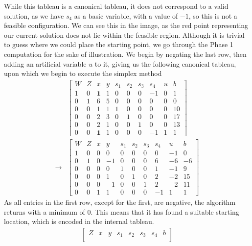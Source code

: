 \documentclass[10pt]{article}
\newenvironment{answerblock}[1]{\tcolorbox[beamer,noparskip,breakable,title={#1}]}{\endtcolorbox}
\begin{document}
\begin{answerblock}{Linear Programming Example Evaluation}
	\vspace{6pt}
	While this tableau is a canonical tableau, it does not correspond to a valid solution, as we have $s_4$ as a basic variable, with a value of $-1$, so this is not a feasible configuration. We can see this in the image, as the red point representing our current solution does not lie within the feasible region. Although it is trivial to guess where we could place the starting point, we go through the Phase 1 computation for the sake of illustration. We begin by negating the last row, then adding an artificial variable $u$ to it, giving us the following canonical tableau, upon which we begin to execute the simplex method
	\begin{align*}
	&\begin{bmatrix}
	W	& Z	& x				& y	& s_1	& s_2	& s_3	& s_4	& u	& b \\
	1	& 0	& \textbf{1}	& 1	& 0		& 0		& 0		& -1	& 0	& 1 \\
	0	& 1	& 6				& 5	& 0		& 0 	& 0 	& 0		& 0	& 0 \\
	0	& 0	& 1 			& 1 & 1 	& 0 	& 0 	& 0		& 0	& 10 \\
	0	& 0	& 2 			& 3 & 0 	& 1 	& 0 	& 0		& 0	& 17 \\
	0	& 0	& 2 			& 1 & 0 	& 0 	& 1 	& 0		& 0	& 13 \\
	0	& 0	& \textbf{1}	& 1 & 0 	& 0 	& 0 	& -1	& 1	& 1
	\end{bmatrix}\\
	\rightarrow
	&\begin{bmatrix}
	W	& Z	& x	& y		& s_1	& s_2	& s_3	& s_4	& u		& b \\
	1	& 0	& 0	& 0		& 0		& 0		& 0		& 0		& -1	& 0 \\
	0	& 1	& 0	& -1	& 0		& 0 	& 0 	& 6		& -6	& -6 \\
	0	& 0	& 0 & 0		& 1 	& 0 	& 0 	& 1		& -1	& 9 \\
	0	& 0	& 0 & 1		& 0 	& 1 	& 0 	& 2		& -2	& 15 \\
	0	& 0	& 0	& -1	& 0 	& 0 	& 1 	& 2		& -2	& 11 \\
	0	& 0	& 1 & 1		& 0 	& 0 	& 0 	& -1	& 1		& 1
	\end{bmatrix}
	\end{align*}
	As all entries in the first row, except for the first, are negative, the algorithm returns with a minimum of 0. This means that it has found a suitable starting location, which is encoded in the internal tableau.
	\begin{align*}
	\begin{bmatrix}
	Z	& x		& y		& s_1	& s_2	& s_3	& s_4	& b \\

\end{bmatrix}
\end{align*}
\end{answerblock}
\end{document}
